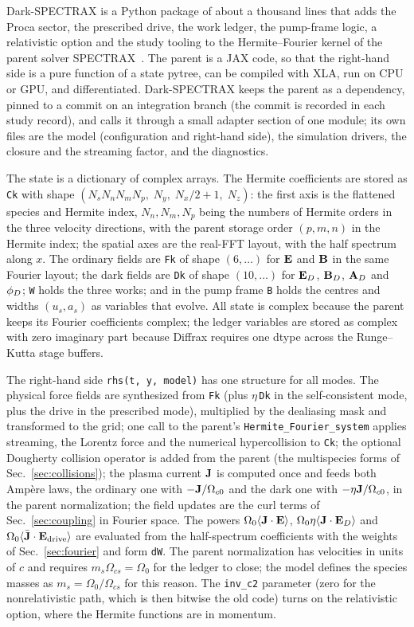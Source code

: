 Dark-SPECTRAX is a Python package of about a thousand lines that adds the Proca sector, the prescribed drive, the work ledger, the pump-frame logic, a relativistic option and the study tooling to the Hermite--Fourier kernel of the parent solver SPECTRAX~\citep{SPECTRAX}. The parent is a JAX code, so that the right-hand side is a pure function of a state pytree, can be compiled with XLA, run on CPU or GPU, and differentiated. Dark-SPECTRAX keeps the parent as a dependency, pinned to a commit on an integration branch (the commit is recorded in each study record), and calls it through a small adapter section of one module; its own files are the model (configuration and right-hand side), the simulation drivers, the closure and the streaming factor, and the diagnostics.

The state is a dictionary of complex arrays. The Hermite coefficients are stored as \texttt{Ck} with shape $(N_sN_nN_mN_p,\;N_y,\;N_x/2+1,\;N_z)$: the first axis is the flattened species and Hermite index, $N_n,N_m,N_p$ being the numbers of Hermite orders in the three velocity directions, with the parent storage order $(p,m,n)$ in the Hermite index; the spatial axes are the real-FFT layout, with the half spectrum along $x$. The ordinary fields are \texttt{Fk} of shape $(6,\dots)$ for $\mathbf E$ and $\mathbf B$ in the same Fourier layout; the dark fields are \texttt{Dk} of shape $(10,\dots)$ for $\mathbf E_D$, $\mathbf B_D$, $\mathbf A_D$ and $\phi_D$; \texttt{W} holds the three works; and in the pump frame \texttt{B} holds the centres and widths $(u_s,a_s)$ as variables that evolve. All state is complex because the parent keeps its Fourier coefficients complex; the ledger variables are stored as complex with zero imaginary part because Diffrax requires one dtype across the Runge--Kutta stage buffers.

The right-hand side \texttt{rhs(t, y, model)} has one structure for all modes. The physical force fields are synthesized from \texttt{Fk} (plus $\eta\,$\texttt{Dk} in the self-consistent mode, plus the drive in the prescribed mode), multiplied by the dealiasing mask and transformed to the grid; one call to the parent's \texttt{Hermite\_Fourier\_system} applies streaming, the Lorentz force and the numerical hypercollision to \texttt{Ck}; the optional Dougherty collision operator is added from the parent (the multispecies forms of Sec.~\ref{sec:collisions}); the plasma current $\mathbf J$ is computed once and feeds both Amp\`ere laws, the ordinary one with $-\mathbf J/\Omega_{c0}$ and the dark one with $-\eta\mathbf J/\Omega_{c0}$, in the parent normalization; the field updates are the curl terms of Sec.~\ref{sec:coupling} in Fourier space. The powers $\Omega_0\langle \mathbf J\cdot\mathbf E\rangle$, $\Omega_0\eta\langle \mathbf J\cdot\mathbf E_D\rangle$ and $\Omega_0\langle \bar{\mathbf J}\cdot\mathbf E_{\rm drive}\rangle$ are evaluated from the half-spectrum coefficients with the weights of Sec.~\ref{sec:fourier} and form \texttt{dW}. The parent normalization has velocities in units of $c$ and requires $m_s\Omega_{cs}=\Omega_0$ for the ledger to close; the model defines the species masses as $m_s=\Omega_0/\Omega_{cs}$ for this reason. The \texttt{inv\_c2} parameter (zero for the nonrelativistic path, which is then bitwise the old code) turns on the relativistic option, where the Hermite functions are in momentum.

